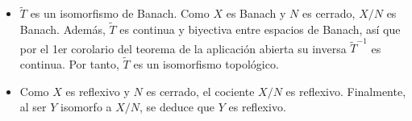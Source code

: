\documentclass[12pt]{article}
\begin{document}
\begin{ejercicio}[2 puntos]
\begin{itemize}
                \item $\widetilde{T}$ es un isomorfismo de Banach. Como $X$ es Banach y $N$ es cerrado, $X/N$ es Banach. Además, $\widetilde{T}$ es continua y biyectiva entre espacios de Banach, así que por el 1er corolario del teorema de la aplicación abierta su inversa $\widetilde{T}^{-1}$ es continua. Por tanto, $\widetilde{T}$ es un isomorfismo topológico.

                \item Como $X$ es reflexivo y $N$ es cerrado, el cociente $X/N$ es reflexivo. Finalmente, al ser $Y$ isomorfo a $X/N$, se deduce que $Y$ es reflexivo.
            
        \end{itemize}
    \end{ejercicio}
    \newpage
\end{document}
